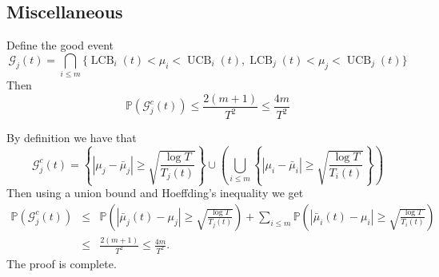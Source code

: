 \documentclass[opre,blindrev]{informs3}
\newcommand{\UCB}{\operatorname{UCB}}
\newcommand{\LCB}{\operatorname{LCB}}
\newcommand{\bP}[1]{{\mathbb{P}\left(#1\right)}}
\begin{document}
\begin{APPENDICES}
\section{Miscellaneous}
\begin{lemma}\label{lem:Gc}
    Define the good event
    \[\mathcal{G}_j(t)=\bigcap_{i\leq m}\bigg\{\LCB_i(t)<\mu_i<\UCB_i(t),\LCB_j(t)<\mu_j<\UCB_j(t)\bigg\}\]
    Then 
    \[\bP{\mathcal{G}^c_j(t)}\leq \frac{2(m+1)}{T^2}\leq \frac{4m}{T^2}\]
\end{lemma}
    By definition we have that 
    \[\mathcal{G}^c_j(t) = \left\{|\mu_j - \bar{\mu}_j| \geq \sqrt{\frac{\log T}{T_j(t)}}\right\} \cup \left(\bigcup_{i\leq m} \left\{|\mu_i - \bar{\mu}_i| \geq \sqrt{\frac{\log T}{T_i(t)}}\right\}\right)\]
    Then using a union bound and Hoeffding's inequality we get
   \begin{eqnarray*}
    \bP{\mathcal{G}^c_j(t)}&\leq& \bP{|\bar{\mu}_j(t)-\mu_j|\geq \sqrt{\frac{\log T}{T_j(t)}}}+\sum_{i\leq m}\bP{|\bar{\mu}_i(t)-\mu_i| 
      \geq \sqrt{\frac{\log T}{T_i(t)}}} 
      \\
    &\leq& \frac{2(m+1)}{T^2}
      \leq \frac{4m}{T^2}.
\end{eqnarray*} 
The proof is complete. \Halmos  


\end{APPENDICES}
\end{document}
